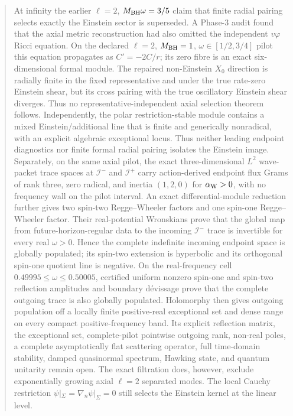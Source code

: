 \documentclass[11pt]{article}
\theoremstyle{definition}
\theoremstyle{remark}
\begin{document}
\begin{abstract}
At infinity the earlier \(\ell=2\), \(M_{\rm BH}\omega=3/5\) claim that finite radial
pairing selects exactly the Einstein sector is superseded.  A Phase-3 audit
found that the axial metric reconstruction had also omitted the independent
\(v\varphi\) Ricci equation.  On the declared \(\ell=2\),
\(M_{\rm BH}=1\), \(\omega\in[1/2,3/4]\) pilot this equation propagates as
\(C'=-2C/r\); its zero fibre is an exact six-dimensional formal module.  The
repaired non-Einstein \(X_0\) direction is radially finite in the fixed
representative and under the true rate-zero Einstein shear, but its cross
pairing with the true oscillatory Einstein shear diverges.  Thus no
representative-independent axial selection theorem follows.  Independently, the polar
restriction-stable module contains a mixed Einstein/additional line that is
finite and generically nonradical, with an explicit algebraic exceptional
locus.  Thus neither leading endpoint diagnostics nor finite formal radial
pairing isolates the Einstein image.  Separately, on the same axial pilot,
the exact three-dimensional \(L^2\) wave-packet trace spaces at
\(\mathscr I^-\) and \(\mathscr I^+\) carry action-derived endpoint flux
Grams of rank three, zero radical, and inertia \((1,2,0)\) for
\(\alpha_{\rm W}>0\), with no frequency wall on the pilot interval.  An
exact differential-module reduction further gives two spin-two
Regge--Wheeler factors and one spin-one Regge--Wheeler factor.  Their
real-potential Wronskians prove that the global map from future-horizon-regular
data to the incoming \(\mathscr I^-\) trace is invertible for every real
\(\omega>0\).  Hence the complete indefinite incoming endpoint space is
globally populated; its spin-two extension is hyperbolic and its orthogonal
spin-one quotient line is negative.  On the real-frequency cell
\(0.49995\le\omega\le0.50005\), certified uniform nonzero spin-one and
spin-two reflection amplitudes and boundary dévissage prove that the
complete outgoing trace is also globally populated.  Holomorphy then gives
outgoing population off a locally finite positive-real exceptional set and
dense range on every compact positive-frequency band.  Its explicit
reflection matrix, the exceptional set, complete-pilot pointwise outgoing
rank, non-real poles, a complete
asymptotically flat scattering operator, full
time-domain stability, damped quasinormal spectrum, Hawking state, and
quantum unitarity remain open.  The exact filtration does, however, exclude
exponentially growing axial \(\ell=2\) separated modes.  The local Cauchy restriction
\(\psi|_\Sigma=\nabla_n\psi|_\Sigma=0\) still selects the Einstein kernel at
the linear level.
\end{abstract}
\end{document}
